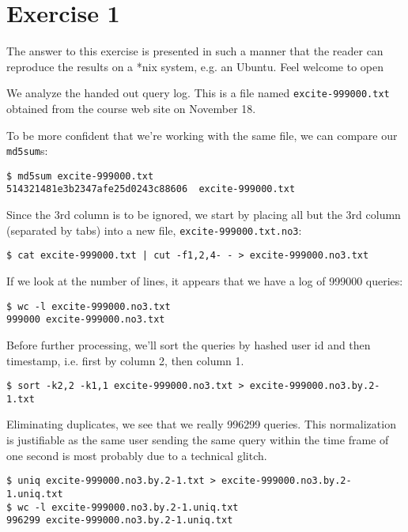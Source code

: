 
\section*{Exercise 1}

The answer to this exercise is presented in such a manner that the reader can
reproduce the results on a *nix system, e.g. an Ubuntu. Feel welcome to open 


We analyze the handed out query log. This is a file named
\texttt{excite-999000.txt} obtained from the course web site on November 18.


To
be more confident that we're working with the same file, we can compare our
\texttt{md5sum}s:

\begin{verbatim}
$ md5sum excite-999000.txt
514321481e3b2347afe25d0243c88606  excite-999000.txt
\end{verbatim}

Since the 3rd column is to be ignored, we start by placing all but the 3rd
column (separated by tabs) into a new file, \texttt{excite-999000.txt.no3}:

\begin{verbatim}
$ cat excite-999000.txt | cut -f1,2,4- - > excite-999000.no3.txt
\end{verbatim}

If we look at the number of lines, it appears that we have a log of 999000
queries:

\begin{verbatim}
$ wc -l excite-999000.no3.txt
999000 excite-999000.no3.txt
\end{verbatim}

Before further processing, we'll sort the queries by hashed user id and then
timestamp, i.e. first by column 2, then column 1.

\begin{verbatim}
$ sort -k2,2 -k1,1 excite-999000.no3.txt > excite-999000.no3.by.2-1.txt
\end{verbatim}

Eliminating duplicates, we see that we really 996299 queries. This
normalization is justifiable as the same user sending the same query within the
time frame of one second is most probably due to a technical glitch.

\begin{verbatim}
$ uniq excite-999000.no3.by.2-1.txt > excite-999000.no3.by.2-1.uniq.txt
$ wc -l excite-999000.no3.by.2-1.uniq.txt 
996299 excite-999000.no3.by.2-1.uniq.txt
\end{verbatim}

